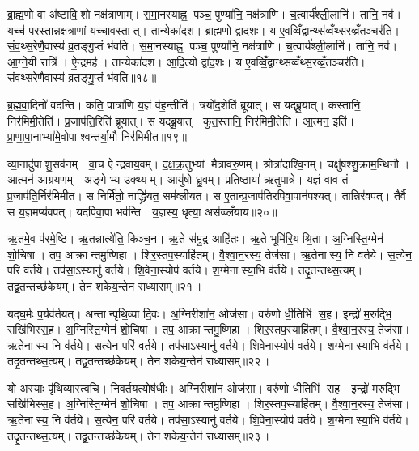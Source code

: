 ब्रा॒ह्म॒णो वा अ॑ष्टावि॒शो नक्ष॑त्राणाम्। स॒मा॒नस्याह्न॒ पञ्च॒ पुण्या॑नि॒ नक्ष॑त्राणि। च॒त्वार्य॑श्ली॒लानि॑। तानि॒ नव॑। यच्च॑ प॒रस्ता॒न्नक्ष॑त्राणां॒ यच्चा॒वस्तात्। तान्येका॑दश। ब्रा॒ह्म॒णो द्वा॑द॒शः। य ए॒वव्विँ॒द्वान्थ्स॑व्वँथ्स॒रव्व्रँ॒तञ्चर॑ति। सं॒व॒थ्स॒रेणै॒वास्य॑ व्र॒तङ्गु॒प्तं भ॑वति। स॒मा॒नस्याह्न॒ पञ्च॒ पुण्या॑नि॒ नक्ष॑त्राणि। च॒त्वार्य॑श्ली॒लानि॑। तानि॒ नव॑। आ॒ग्ने॒यी रात्रि॑। ऐ॒न्द्रमह॑। तान्येका॑दश। आ॒दि॒त्यो द्वा॑द॒शः। य ए॒वव्विँ॒द्वान्थ्स॑व्वँथ्स॒रव्व्रँ॒तञ्चर॑ति। सं॒व॒थ्स॒रेणै॒वास्य॑ व्र॒तङ्गु॒प्तं भ॑वति॥१८॥\anuvakamend[स॒ङ्ग॒वाथ्षो॑ड॒शिन॒न्निर॑मिमत॒ तत्तदात्त॑वीर्यन्निर्मा॒र्गो व॑देद्भवति समा॒नस्याह्न॒ पञ्च॒ पुण्या॑नि॒ नक्ष॑त्राण्य॒ष्टौ च॑]

ब्र॒ह्म॒वा॒दिनो॑ वदन्ति। कति॒ पात्रा॑णि य॒ज्ञं व॑ह॒न्तीति॑। त्रयो॑द॒शेति॑ ब्रूयात्। स यद्ब्रू॒यात्। कस्तानि॒ निर॑मिमी॒तेति॑। प्र॒जाप॑ति॒रिति॑ ब्रूयात्। स यद्ब्रू॒यात्। कुत॒स्तानि॒ निर॑मिमी॒तेति॑। आ॒त्मन॒ इति॑। प्रा॒णा॒पा॒नाभ्या॑मे॒वोपाश्वन्तर्या॒मौ निर॑मिमीत॥१९॥

व्या॒नादु॑पाशु॒सव॑नम्। वा॒च ऐन्द्रवाय॒वम्। द॒क्ष॒क्र॒तुभ्यां मैत्रावरु॒णम्। श्रोत्रा॑दाश्वि॒नम्। चक्षु॑षश्शु॒क्राम॒न्थिनौ। आ॒त्मन॑ आग्रय॒णम्। अङ्गेभ्य उ॒क्थ्यम्। आयु॑षो ध्रु॒वम्। प्र॒ति॒ष्ठाया॑ ऋतुपा॒त्रे। य॒ज्ञं वाव तं प्र॒जाप॑ति॒र्निर॑मिमीत। स निर्मि॑तो॒ नाद्ध्रि॑यत॒ सम॑व्लीयत। स ए॒तान्प्र॒जाप॑तिरपिवा॒पान॑पश्यत्। तान्निर॑वपत्। तैर्वै स य॒ज्ञमप्य॑वपत्। यद॑पिवा॒पा भव॑न्ति। य॒ज्ञस्य॒ धृत्या॒ अस॑व्व्लँयाय॥२०॥\anuvakamend[उ॒पा॒श्व॒न्त॒र्या॒मौ निर॑मिमीतामिमीत॒ षट्च॑]

ऋ॒तमे॒व प॑रमे॒ष्ठि। ऋ॒तन्नात्ये॑ति॒ किञ्च॒न। ऋ॒ते स॑मु॒द्र आहि॑तः। ऋ॒ते भूमि॑रि॒यश्रि॒ता। अ॒ग्निस्ति॒ग्मेन॑ शो॒चिषा। तप॒ आक्रान्तमु॒ष्णिहा। शिर॒स्तप॒स्याहि॑तम्। वै॒श्वा॒न॒रस्य॒ तेज॑सा। ऋ॒तेनास्य॒ नि व॑र्तये। स॒त्येन॒ परि॑ वर्तये। तप॑सा॒ऽस्यानु॑ वर्तये। शि॒वेना॒स्योप॑ वर्तये। श॒ग्मेनास्या॒भि व॑र्तये। तदृ॒तन्तथ्स॒त्यम्। तद्व्र॒तन्तच्छ॑केयम्। तेन॑ शकेय॒न्तेन॑ राध्यासम्॥२१॥

यद्घ॒र्मः प॒र्यव॑र्तयत्। अन्तान्पृथि॒व्या दि॒वः। अ॒ग्निरीशा॑न॒ ओज॑सा। वरु॑णो धी॒तिभि॑ स॒ह। इन्द्रो॑ म॒रुद्भि॒ सखि॑भिस्स॒ह। अ॒ग्निस्ति॒ग्मेन॑ शो॒चिषा। तप॒ आक्रान्तमु॒ष्णिहा। शिर॒स्तप॒स्याहि॑तम्। वै॒श्वा॒न॒रस्य॒ तेज॑सा। ऋ॒तेनास्य॒ नि व॑र्तये। स॒त्येन॒ परि॑ वर्तये। तप॑सा॒ऽस्यानु॑ वर्तये। शि॒वेना॒स्योप॑ वर्तये। श॒ग्मेनास्या॒भि व॑र्तये। तदृ॒तन्तथ्स॒त्यम्। तद्व्र॒तन्तच्छ॑केयम्। तेन॑ शकेय॒न्तेन॑ राध्यासम्॥२२॥

यो अ॒स्याः पृ॑थि॒व्यास्त्व॒चि। नि॒व॒र्तय॒त्योष॑धीः। अ॒ग्निरीशा॑न॒ ओज॑सा। वरु॑णो धी॒तिभि॑ स॒ह। इन्द्रो॑ म॒रुद्भि॒ सखि॑भिस्स॒ह। अ॒ग्निस्ति॒ग्मेन॑ शो॒चिषा। तप॒ आक्रान्तमु॒ष्णिहा। शिर॒स्तप॒स्याहि॑तम्। वै॒श्वा॒न॒रस्य॒ तेज॑सा। ऋ॒तेनास्य॒ नि व॑र्तये। स॒त्येन॒ परि॑ वर्तये। तप॑सा॒ऽस्यानु॑ वर्तये। शि॒वेना॒स्योप॑ वर्तये। श॒ग्मेनास्या॒भि व॑र्तये। तदृ॒तन्तथ्स॒त्यम्। तद्व्र॒तन्तच्छ॑केयम्। तेन॑ शकेय॒न्तेन॑ राध्यासम्॥२३॥

